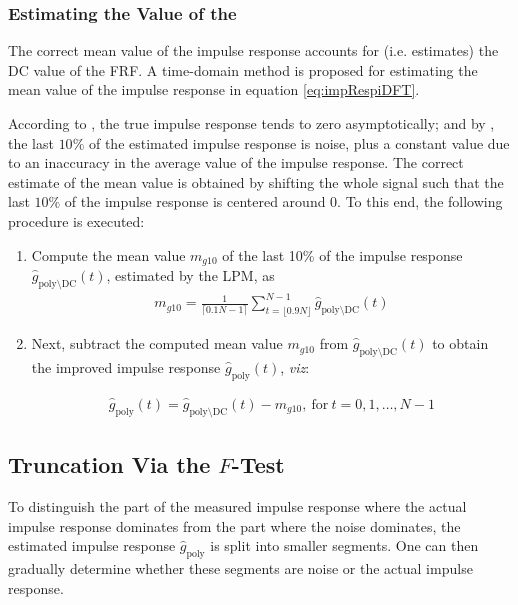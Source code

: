 \subsubsection{Estimating the  Value of the }\label{se:DCvalueEst}
The correct mean value of the impulse response accounts for (i.e. estimates) the \gls{DC} value of the \gls{FRF}. A time-domain method is proposed for estimating the mean value of the impulse response in equation \eqref{eq:impRespiDFT}. %

According to , the true impulse response tends to zero asymptotically; and by , the last $10\%$ of the estimated impulse response is noise, plus a constant value due to an inaccuracy in the average value of the impulse response. The correct estimate of the mean value is obtained by shifting the whole signal such that the last $10\%$ of the impulse response is centered around 0.
To this end, the following procedure is executed:


\begin{enumerate}
\item Compute the mean value $m_{g10}$ of the last 10\% of the impulse response $\hat g_{\mathrm{poly}\setminus \mathrm{DC
}}(t)$, estimated by the \gls{LPM}, as %
\begin{align}
m_{g10} = \frac{1}{\lceil0.1N - 1\rceil}\sum_{t=\lfloor0.9N\rfloor}^{N-1}\hat g_{\mathrm{poly}\setminus \mathrm{DC
}}(t)
\end{align}

\item Next, subtract the computed mean value $m_{g10}$ from $\hat g_{\mathrm{poly}\setminus \mathrm{DC
}}(t)$ to obtain the improved impulse response $\hat g_\mathrm{poly}(t)$, \emph{viz}:


\begin{align}
\hat g_\mathrm{poly}(t) = \hat g_{\mathrm{poly}\setminus \mathrm{DC}}(t) - m_{g10},\ \text{for}\ t=0,1,\dots,N-1
\end{align}
\end{enumerate}

\subsection{Truncation Via the $F$-Test}
\label{sec:nonparametric:truncation:ftest}
To distinguish the part of the measured impulse response where the actual impulse response dominates from the part where the noise dominates, the estimated impulse response $\hat{g}_\mathrm{poly}$ is split into smaller segments. 
One can then gradually determine whether these segments are noise or the actual impulse response.


